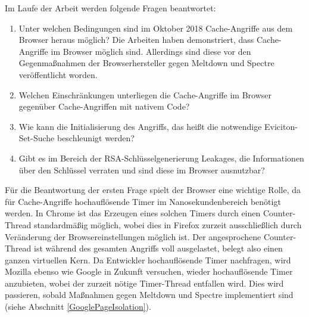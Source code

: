 
Im Laufe der Arbeit werden folgende Fragen beantwortet:

\begin{enumerate}
\item Unter welchen Bedingungen sind im Oktober 2018 Cache-Angriffe aus dem Browser heraus möglich?
Die Arbeiten \cite{TheSpyInTheSandbox,DriveByPaper,ASLROnTheLine} haben demonstriert, dass Cache-Angriffe im Browser möglich sind.
Allerdings sind diese vor den Gegenmaßnahmen der Browserhersteller gegen Meltdown und Spectre veröffentlicht worden.

\item Welchen Einschränkungen unterliegen die Cache-Angriffe im Browser gegenüber Cache-Angriffen mit nativem Code?

\item Wie kann die Initialisierung des Angriffs, das heißt die notwendige Eviciton-Set-Suche beschleunigt werden?

\item Gibt es im Bereich der RSA-Schlüsselgenerierung Leakages, die Informationen über den Schlüssel verraten und sind diese im Browser ausnutzbar?
\end{enumerate}


Für die Beantwortung der ersten Frage spielt der Browser eine wichtige Rolle, da für Cache-Angriffe hochauflösende Timer im Nanosekundenbereich benötigt werden.
In Chrome ist das Erzeugen eines solchen Timers durch einen Counter-Thread standardmäßig möglich, wobei dies in Firefox zurzeit ausschließlich durch Veränderung der Browsereinstellungen möglich ist.
Der angesprochene Counter-Thread ist während des gesamten Angriffs voll ausgelastet, belegt also einen ganzen virtuellen Kern.
Da Entwickler hochauflösende Timer nachfragen, wird Mozilla ebenso wie Google in Zukunft versuchen, wieder hochauflösende Timer anzubieten, wobei der zurzeit nötige Timer-Thread entfallen wird.
Dies wird passieren, sobald Maßnahmen gegen Meltdown und Spectre implementiert sind (siehe Abschnitt \ref{GooglePageIsolation}).

\par \medskip  



